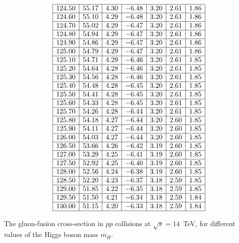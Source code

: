 \begin{table}[!h]
\begin{center}
\begin{equation}
\begin{array}{|c|c|c|c|c|c|c|}
\hline 
124.50 & 55.17 & 4.30 & -6.48 & 3.20 & 2.61 & 1.86\\
\hline 
124.60 & 55.10 & 4.29 & -6.48 & 3.20 & 2.61 & 1.86\\
\hline 
124.70 & 55.02 & 4.29 & -6.47 & 3.20 & 2.61 & 1.86\\
\hline 
124.80 & 54.94 & 4.29 & -6.47 & 3.20 & 2.61 & 1.86\\
\hline 
124.90 & 54.86 & 4.29 & -6.47 & 3.20 & 2.61 & 1.86\\
\hline 
125.00 & 54.79 & 4.29 & -6.47 & 3.20 & 2.61 & 1.86\\
\hline 
125.10 & 54.71 & 4.29 & -6.46 & 3.20 & 2.61 & 1.85\\
\hline 
125.20 & 54.64 & 4.28 & -6.46 & 3.20 & 2.61 & 1.85\\
\hline 
125.30 & 54.56 & 4.28 & -6.46 & 3.20 & 2.61 & 1.85\\
\hline 
125.40 & 54.48 & 4.28 & -6.45 & 3.20 & 2.61 & 1.85\\
\hline 
125.50 & 54.41 & 4.28 & -6.45 & 3.20 & 2.61 & 1.85\\
\hline 
125.60 & 54.33 & 4.28 & -6.45 & 3.20 & 2.61 & 1.85\\
\hline 
125.70 & 54.26 & 4.28 & -6.44 & 3.20 & 2.61 & 1.85\\
\hline 
125.80 & 54.18 & 4.27 & -6.44 & 3.20 & 2.60 & 1.85\\
\hline 
125.90 & 54.11 & 4.27 & -6.44 & 3.20 & 2.60 & 1.85\\
\hline 
126.00 & 54.03 & 4.27 & -6.44 & 3.20 & 2.60 & 1.85\\
\hline 
126.50 & 53.66 & 4.26 & -6.42 & 3.19 & 2.60 & 1.85\\
\hline 
127.00 & 53.29 & 4.25 & -6.41 & 3.19 & 2.60 & 1.85\\
\hline 
127.50 & 52.92 & 4.25 & -6.40 & 3.19 & 2.60 & 1.85\\
\hline 
128.00 & 52.56 & 4.24 & -6.38 & 3.19 & 2.60 & 1.85\\
\hline 
128.50 & 52.20 & 4.23 & -6.37 & 3.18 & 2.59 & 1.85\\
\hline 
129.00 & 51.85 & 4.22 & -6.35 & 3.18 & 2.59 & 1.85\\
\hline 
129.50 & 51.50 & 4.21 & -6.34 & 3.18 & 2.59 & 1.84\\
\hline 
130.00 & 51.15 & 4.20 & -6.33 & 3.18 & 2.59 & 1.84\\
\hline
\end{array}
\nonumber
\end{equation}
\end{center}
\caption{The gluon-fusion cross-section in $pp$ collisions at $\sqrt{s}=14$~TeV, for different values of the Higgs boson mass $m_H$. \label{ggF:14TeV}}
\end{table}

